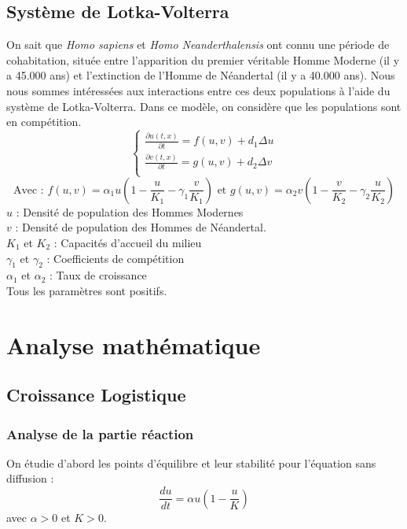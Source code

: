 \documentclass[a4paper,11pt]{article}
\begin{document}
\subsection{Système de Lotka-Volterra}
On sait que \textit{Homo sapiens} et \textit{Homo Neanderthalensis} ont connu une période de cohabitation, située entre l’apparition du premier véritable Homme Moderne (il y a 45.000 ans) et l’extinction de l'Homme de Néandertal (il y a 40.000 ans). Nous nous sommes intéressées aux interactions entre ces deux populations à l'aide du système de Lotka-Volterra. Dans ce modèle, on considère que les populations sont en compétition.\\
$$\begin{cases} \frac{\partial u(t,x)}{\partial t} = f(u,v) + d_1\Delta u\\ \frac{\partial v(t,x)}{\partial t} = g(u,v) + d_2 \Delta v \\ 
\end{cases}$$
$$\text{Avec : } f(u,v) = \alpha_1 u\left(1-\frac{u}{K_1}-\gamma_1\frac{v}{K_1}\right) \text{ et } g(u,v) = \alpha_2 v\left(1-\frac{v}{K_2}-\gamma_2\frac{u}{K_2}\right)$$
$u$ : Densité de population des Hommes Modernes \\
$v$ : Densité de population des Hommes de Néandertal.\\
$K_1$ et $K_2$ : Capacités d'accueil du milieu\\
$\gamma_1$ et $\gamma_2$ : Coefficients de compétition\\
$\alpha_1$ et $\alpha_2$ : Taux de croissance\\

\noindent Tous les paramètres sont positifs.

\section{Analyse mathématique}
\subsection{Croissance Logistique}
\subsubsection{Analyse de la partie réaction}

On étudie d'abord les points d'équilibre et leur stabilité pour l'équation sans diffusion : $$\frac{du}{dt}=\alpha u (1- \dfrac{u}{K})$$
avec $\alpha>0$ et $K>0$.
\newline
\end{document}
